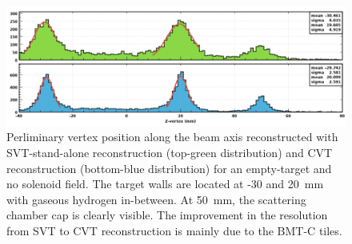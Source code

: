 \begin{figure}[htb]
 \includegraphics[width=2.0\columnwidth,keepaspectratio]{images/NIM_SVTvsCVT.png}
 \caption{Perliminary vertex position along the beam axis reconstructed with SVT-stand-alone reconstruction (top-green 
distribution) and    CVT reconstruction (bottom-blue distribution) for an empty-target and no solenoid field. The 
target walls are located at    -30 and 20~mm with gaseous hydrogen in-between. At 50~mm, the scattering chamber cap is 
clearly visible. The improvement in the resolution from SVT to CVT reconstruction is mainly due to the BMT-C tiles.}
 \label{fig:mm-zvertex}
\end{figure}
